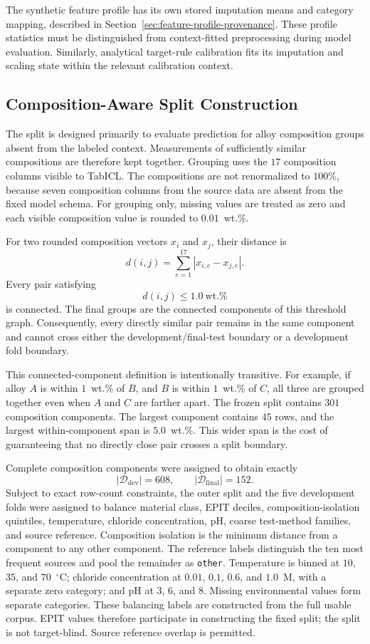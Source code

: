 \documentclass{article}
\begin{document}
The synthetic feature profile has its own stored imputation means and category
mapping, described in Section~\ref{sec:feature-profile-provenance}. These
profile statistics must be distinguished from context-fitted preprocessing
during model evaluation. Similarly, analytical target-rule calibration fits
its imputation and scaling state within the relevant calibration context.

\subsection{Composition-Aware Split Construction}
\label{sec:composition-split}

The split is designed primarily to evaluate prediction for alloy composition
groups absent from the labeled context. Measurements of sufficiently similar
compositions are therefore kept together. Grouping uses the \(17\) composition
columns visible
to TabICL. The compositions are not renormalized to \(100\%\), because seven
composition columns from the source data are absent from the fixed model
schema. For grouping only, missing values are treated as zero and each visible
composition value is rounded to \(0.01\)~wt.\%.

For two rounded composition vectors \(x_i\) and \(x_j\), their distance is
\[
d(i,j)=\sum_{e=1}^{17}|x_{i,e}-x_{j,e}|.
\]
Every pair satisfying
\[
d(i,j)\leq1.0\ \text{wt.\%}
\]
is connected. The final groups are the connected components of this threshold
graph. Consequently, every directly similar pair remains in the same component
and cannot cross either the development/final-test boundary or a development
fold boundary.

This connected-component definition is intentionally transitive. For example,
if alloy \(A\) is within \(1\)~wt.\% of \(B\), and \(B\) is within
\(1\)~wt.\% of \(C\), all three are grouped together even when \(A\) and
\(C\) are farther apart. The frozen split contains \(301\) composition
components. The largest component contains \(45\) rows, and the largest
within-component span is \(5.0\)~wt.\%. This wider span is the cost of
guaranteeing that no directly close pair crosses a split boundary.

Complete composition components were assigned to obtain exactly
\[
|\mathcal{D}_{\mathrm{dev}}|=608,
\qquad
|\mathcal{D}_{\mathrm{final}}|=152.
\]
Subject to exact row-count constraints, the outer split and the five
development folds were assigned to balance material class, EPIT deciles,
composition-isolation quintiles, temperature, chloride concentration, pH,
coarse test-method families, and source reference. Composition isolation is
the minimum distance from a component to any other component. The reference
labels distinguish the ten most frequent sources and pool the remainder as
\texttt{other}. Temperature is binned at \(10\), \(35\), and
\(70\)~\(^{\circ}\mathrm{C}\); chloride concentration at \(0.01\), \(0.1\),
\(0.6\), and \(1.0\)~M, with a separate zero category; and pH at \(3\),
\(6\), and \(8\). Missing environmental values form separate categories.
These balancing labels are constructed from the full usable corpus. EPIT
values therefore participate in constructing the fixed split; the split is
not target-blind. Source reference overlap is permitted.
\end{document}
